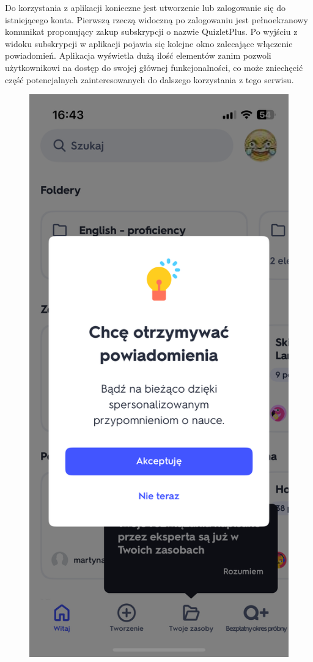 \documentclass[final,a4paper,openany,12pt]{mwbk}
\begin{document}
Do korzystania z aplikacji konieczne jest utworzenie lub zalogowanie się do istniejącego konta. Pierwszą rzeczą widoczną po zalogowaniu jest pełnoekranowy komunikat proponujący zakup subskrypcji o nazwie QuizletPlus. Po wyjściu z widoku subskrypcji w aplikacji pojawia się kolejne okno zalecające włączenie powiadomień. Aplikacja wyświetla dużą ilość elementów zanim pozwoli użytkownikowi na dostęp do swojej głównej funkcjonalności, co może zniechęcić część potencjalnych zainteresowanych do dalszego korzystania z tego serwisu. 

\begin{figure}[H]
\centering
\begin{minipage}{0.5\textwidth}
  \centering
\includegraphics[width=.75\linewidth]{img/quizlet3.PNG}

\end{minipage}
\end{figure}
\end{document}
